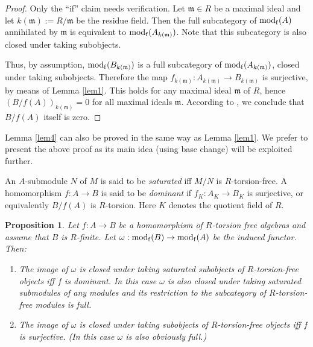 \documentclass[12pt]{amsart}
\theoremstyle{plain}
\newtheorem{prop}[thm]{Proposition}
\theoremstyle{definition}
\newtheorem{rmk}[thm]{Remark}
\numberwithin{thm}{section}
\def\mod{{\rm mod}}
\begin{document}
\begin{proof} Only the ``if'' claim needs 
verification. Let $\mathfrak m\in R$ be a 
maximal ideal and let $k(\mathfrak 
m):=R/\mathfrak m$ be the residue field. Then 
the full subcategory of $\mod_{\rm f}(A)$ annihilated by 
$\mathfrak m$ is equivalent to 
$\mod_{\rm f}(A_{k(\mathfrak m)})$. Note that this subcategory is also closed under taking subobjects.


Thus, by assumption, 
$\mod_{\rm f}(B_{k(\mathfrak m)})$ is a full 
subcategory of $\mod_{\rm f}(A_{k(\mathfrak m)})$,
closed under taking subobjects. Therefore the 
map $f_{k(\mathfrak m)} :A_{k(\mathfrak m)}\to 
B_{k(\mathfrak m)}$ is surjective, by means of 
Lemma \ref{lem1}. This holds for any maximal ideal 
$\mathfrak m$ of $R$, hence
$(B/f(A))_{k(\mathfrak m)}=0$ for all 
maximal ideals $\mathfrak m$. According to 
\cite[Thm~4.8]{Mats}, we conclude that 
$B/f(A)$ itself is zero.
\end{proof}


Lemma \ref{lem4} can also be proved in the same way as Lemma \ref{lem1}.
We prefer to present the above proof as its main idea (using base change) will be exploited further. 
 
An $A$-submodule $N$ of $M$ is said to be 
{\em saturated} iff $M/N$ is $R$-torsion-free.
A homomorphism $f:A\to B$ is said to be
{\em dominant} if 
$f_K :A_K \to B_K$ is surjective, or 
equivalently $B/f(A)$ is $R$-torsion. Here $K$ denotes the quotient field of $R$.

\begin{prop}\label{prop5}
Let $f:A\to B$ be a homomorphism of $R$-torsion 
free algebras and assume that $B$ is 
$R$-finite. Let $\omega:\mod_{\rm f}(B)\to\mod_{\rm f}(A)$ be the induced functor. Then:
\begin{enumerate}\item The image of 
$\omega$ is closed under taking saturated 
subobjects of $R$-torsion-free objects iff $f$ 
is dominant. In this case $\omega$ is also closed under taking saturated submodules of any modules and its restriction to the subcategory of $R$-torsion-free modules is full.
\item The image of $\omega$ is closed 
under taking subobjects of $R$-torsion-free 
objects iff $f$ is surjective. (In this case 
$\omega$ is also obviously full.)
\end{enumerate}

\end{prop}
\end{document}
